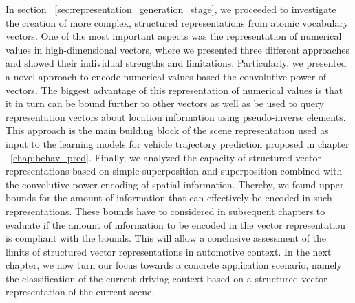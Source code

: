 In section ~\ref{sec:representation_generation_stage}, we proceeded to investigate the creation of more complex, structured representations from atomic vocabulary vectors.
One of the most important aspects was the representation of numerical values in high-dimensional vectors, where we presented three different approaches and showed their individual strengths and limitations.
Particularly, we presented a novel approach to encode numerical values based the convolutive power of vectors.
The biggest advantage of this representation of numerical values is that it in turn can be bound further to other vectors as well as be used to query representation vectors about location information using pseudo-inverse elements.
This approach is the main building block of the scene representation used as input to the learning models for vehicle trajectory prediction proposed in chapter ~\ref{chap:behav_pred}.
Finally, we analyzed the capacity of structured vector representations based on simple superposition and superposition combined with the convolutive power encoding of spatial information.
Thereby, we found upper bounds for the amount of information that can effectively be encoded in such representations.
These bounds have to considered in subsequent chapters to evaluate if the amount of information to be encoded in the vector representation is compliant with the bounds.
This will allow a conclusive assessment of the limits of structured vector representations in automotive context.
In the next chapter, we now turn our focus towards a concrete application scenario, namely the classification of the current driving context based on a structured vector representation of the current scene.

